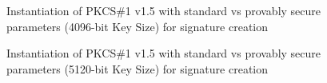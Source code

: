 \documentclass[]{final_report}
\theoremstyle{definition}
\begin{document}
\begin{figure}[H]
    \centering %
     \caption{Instantiation of PKCS\#1 v1.5 with standard vs provably secure parameters (4096-bit Key Size) for signature creation}
    \begin{minipage}{\textwidth}
        \centering
    \end{minipage}
             \label{pkcs_sign_4096bit_table}
\end{figure}

\begin{figure}[H]
    \centering %
     \caption{Instantiation of PKCS\#1 v1.5 with standard vs provably secure parameters (5120-bit Key Size) for signature creation}
    \begin{minipage}{\textwidth}
        \centering
    \end{minipage}
     \label{pkcs_sign_5120bit_table}
\end{figure}
\end{document}
